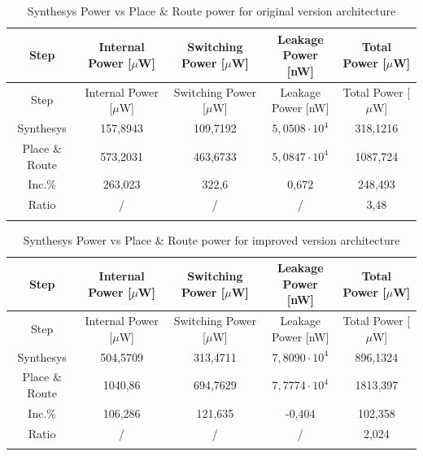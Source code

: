 \documentclass[a4paper, titlepage]{article}
\begin{document}
\begin{longtable}{*5c}
\caption{Synthesys Power vs Place \& Route power for original version architecture}
\label{tab:comparison}\\
\toprule
Step &  \thead{Internal\\Power [$\mu$W]} &  \thead{Switching\\Power [$\mu$W]} &  \thead{Leakage\\Power [nW]} &  \thead{Total\\Power [$\mu$W]}\\
\midrule
\endfirsthead
Step &  \thead{Internal\\Power [$\mu$W]} &  \thead{Switching\\Power [$\mu$W]} &  \thead{Leakage\\Power [nW]} &  \thead{Total\\Power [$\mu$W]}\\
\midrule
\endhead
\midrule
\endfoot
Synthesys & 157,8943 & 109,7192 & $5,0508\cdot 10^4$ & 318,1216  \\
Place \& Route & 573,2031 & 463,6733 & $5,0847\cdot 10^4$ & 1087,724\\
\bottomrule
Inc.\% & 263,023 & 322,6 & 0,672  & 248,493 \\
Ratio & / & / & / & 3,48 \\
\bottomrule
\endlastfoot
\end{longtable}

\begin{longtable}{*5c}
\caption{Synthesys Power vs Place \& Route power for improved version architecture}
\label{tab:synth_placeroute_power_la}\\
\toprule
Step &  \thead{Internal\\Power [$\mu$W]} &  \thead{Switching\\Power [$\mu$W]} &  \thead{Leakage\\Power [nW]} &  \thead{Total\\Power [$\mu$W]}\\
\midrule
\endfirsthead
Step &  \thead{Internal\\Power [$\mu$W]} &  \thead{Switching\\Power [$\mu$W]} &  \thead{Leakage\\Power [nW]} &  \thead{Total\\Power [$\mu$W]}\\
\midrule
\endhead
\midrule
\endfoot
Synthesys & 504,5709 & 313,4711 & $7,8090\cdot 10^4$ & 896,1324  \\
Place \& Route & 1040,86 & 694,7629 & $7,7774 \cdot 10^4$ & 1813,397\\
\bottomrule
Inc.\%& 106,286 & 121,635 & -0,404  & 102,358 \\
Ratio & / & / & / & 2,024 \\
\bottomrule
\endlastfoot
\end{longtable}
\end{document}

